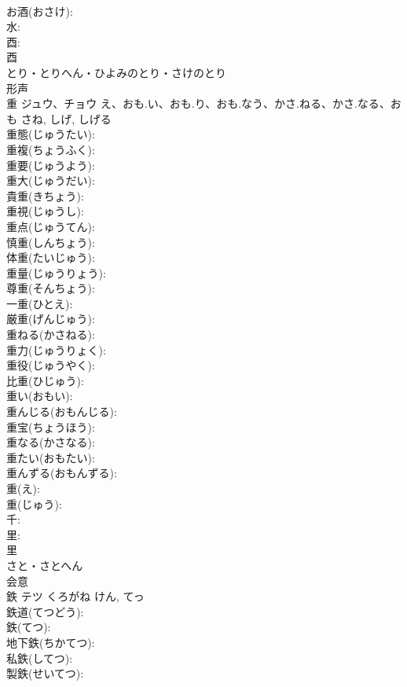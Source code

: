\documentclass[8pt]{extreport}
\begin{document}
\begin{CJK}{UTF8}{min}
\\	お酒(おさけ): 
\\	水: 
\\	酉: 
\\	酉	
\\	とり・とりへん・ひよみのとり・さけのとり	
\\	形声 
\\	重	ジュウ、チョウ	え、おも.い、おも.り、おも.なう、かさ.ねる、かさ.なる、おも	さね, しげ, しげる	
\\	重態(じゅうたい): 
\\	重複(ちょうふく): 
\\	重要(じゅうよう): 
\\	重大(じゅうだい): 
\\	貴重(きちょう): 
\\	重視(じゅうし): 
\\	重点(じゅうてん): 
\\	慎重(しんちょう): 
\\	体重(たいじゅう): 
\\	重量(じゅうりょう): 
\\	尊重(そんちょう): 
\\	一重(ひとえ): 
\\	厳重(げんじゅう): 
\\	重ねる(かさねる): 
\\	重力(じゅうりょく): 
\\	重役(じゅうやく): 
\\	比重(ひじゅう): 
\\	重い(おもい): 
\\	重んじる(おもんじる): 
\\	重宝(ちょうほう): 
\\	重なる(かさなる): 
\\	重たい(おもたい): 
\\	重んずる(おもんずる): 
\\	重(え): 
\\	重(じゅう): 
\\	千: 
\\	里: 
\\	里	
\\	さと・さとへん	
\\	会意 
\\	鉄	テツ	くろがね	けん, てっ	
\\	鉄道(てつどう): 
\\	鉄(てつ): 
\\	地下鉄(ちかてつ): 
\\	私鉄(してつ): 
\\	製鉄(せいてつ): 

\end{CJK}
\end{document}
